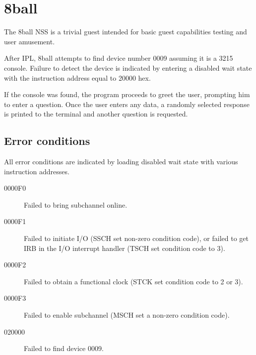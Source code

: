 \chapter{8ball}
\label{chap:8ball}
The 8ball NSS is a trivial guest intended for basic guest capabilities
testing and user amusement.

After IPL, 8ball attempts to find device number \mbox{0009} assuming it is a
3215 console.  Failure to detect the device is indicated by entering a
disabled wait state with the instruction address equal to 20000 hex.

If the console was found, the program proceeds to greet the user, prompting
him to enter a question.  Once the user enters any data, a randomly selected
response is printed to the terminal and another question is requested.

\section{Error conditions}
All error conditions are indicated by loading disabled wait state with
various instruction addresses.

\begin{description}
\item[0000F0] Failed to bring subchannel online.
\item[0000F1] Failed to initiate I/O (SSCH set non-zero condition code), or
	failed to get IRB in the I/O interrupt handler (TSCH set condition
	code to 3).
\item[0000F2] Failed to obtain a functional clock (STCK set condition code to
	2 or 3).
\item[0000F3] Failed to enable subchannel (MSCH set a non-zero condition code).
\item[020000] Failed to find device 0009.
\end{description}

